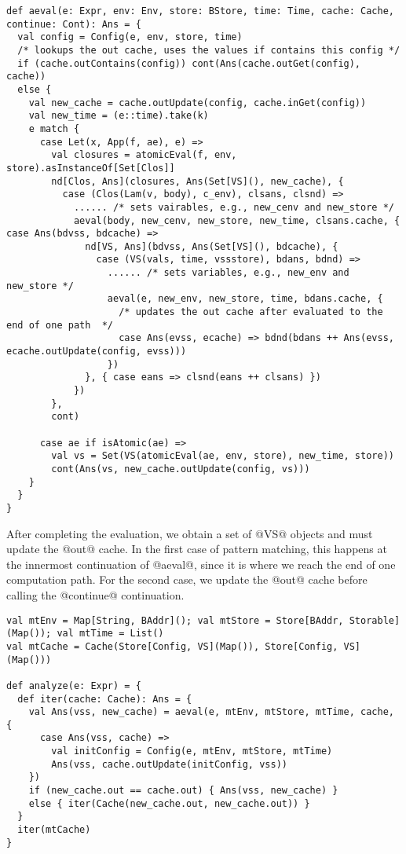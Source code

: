 \documentclass[acmsmall]{acmart}\settopmatter{}
\begin{document}
\begin{lstlisting}
def aeval(e: Expr, env: Env, store: BStore, time: Time, cache: Cache, continue: Cont): Ans = {
  val config = Config(e, env, store, time)
  /* lookups the out cache, uses the values if contains this config */
  if (cache.outContains(config)) cont(Ans(cache.outGet(config), cache))
  else {
    val new_cache = cache.outUpdate(config, cache.inGet(config))
    val new_time = (e::time).take(k)
    e match {
      case Let(x, App(f, ae), e) =>
        val closures = atomicEval(f, env, store).asInstanceOf[Set[Clos]]
        nd[Clos, Ans](closures, Ans(Set[VS](), new_cache), { 
          case (Clos(Lam(v, body), c_env), clsans, clsnd) =>
            ...... /* sets vairables, e.g., new_cenv and new_store */
            aeval(body, new_cenv, new_store, new_time, clsans.cache, { case Ans(bdvss, bdcache) =>
              nd[VS, Ans](bdvss, Ans(Set[VS](), bdcache), { 
                case (VS(vals, time, vssstore), bdans, bdnd) =>
                  ...... /* sets variables, e.g., new_env and new_store */
                  aeval(e, new_env, new_store, time, bdans.cache, { 
                    /* updates the out cache after evaluated to the end of one path  */
                    case Ans(evss, ecache) => bdnd(bdans ++ Ans(evss, ecache.outUpdate(config, evss)))
                  })
              }, { case eans => clsnd(eans ++ clsans) })
            })
        }, 
        cont)

      case ae if isAtomic(ae) =>
        val vs = Set(VS(atomicEval(ae, env, store), new_time, store))
        cont(Ans(vs, new_cache.outUpdate(config, vs)))
    }
  }
}
\end{lstlisting}

After completing the evaluation, we obtain a set of @VS@ objects and must update the @out@ cache.
In the first case of pattern matching, this happens at the innermost continuation of @aeval@,
since it is where we reach the end of one computation path.
For the second case, we update the @out@ cache before calling the @continue@ continuation.

\begin{lstlisting}
val mtEnv = Map[String, BAddr](); val mtStore = Store[BAddr, Storable](Map()); val mtTime = List()
val mtCache = Cache(Store[Config, VS](Map()), Store[Config, VS](Map()))

def analyze(e: Expr) = {
  def iter(cache: Cache): Ans = {
    val Ans(vss, new_cache) = aeval(e, mtEnv, mtStore, mtTime, cache, {
      case Ans(vss, cache) => 
        val initConfig = Config(e, mtEnv, mtStore, mtTime) 
        Ans(vss, cache.outUpdate(initConfig, vss))
    })
    if (new_cache.out == cache.out) { Ans(vss, new_cache) }
    else { iter(Cache(new_cache.out, new_cache.out)) }
  }
  iter(mtCache)
}
\end{lstlisting}
\end{document}
